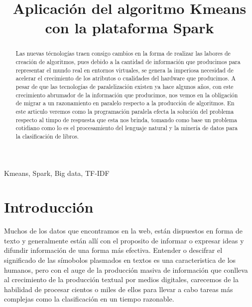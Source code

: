 \documentclass[conference,compsoc]{IEEEtran}
\begin{document}
\title{Aplicación del algoritmo Kmeans con la plataforma Spark}

\author{
    \and
}

\maketitle

\begin{IEEEkeywords}
    Kmeans, Spark, Big data, TF-IDF
\end{IEEEkeywords}

\vspace{0.5cm}

\begin{abstract}
Las nuevas técnologías traen consigo cambios en la forma de realizar las labores
de creación de algoritmos, pues debido a la cantidad de información que
producimos para representar el mundo real en entornos virtuales, se genera
la imperiosa necesidad de acelerar el crecimiento de los atributos o cualidades
del hardware que producimos. A pesar de que las tecnologías de
paralelización existen ya hace algunos años, con este crecimiento abrumador de
la información que producimos, nos vemos en la obligación de migrar a un
razonamiento en paralelo respecto a la producción de algoritmos. En este
articulo veremos como la programación paralela efecta la solución del problema
respecto al timpo de respuesta que esta nos brinda, tomando como base un
problema cotidiano como lo es el procesamiento del lenguaje natural y la
minería de datos para la clasificación de libros.
\end{abstract}

\section{Introducción}
Muchos de los datos que encontramos en la web, están dispuestos en forma de
texto y generalmente están allí  con el proposito de informar o expresar ideas
y difundir información de una forma más efectiva. Entender o descifrar  el
significado de las símobolos plasmados en textos es una caracteristica de los
humanos, pero con el auge de la producción masiva de información que conlleva
al crecimiento de la producción textual por medios digitales, carecemos de la
habilidad de procesar cientos o miles de ellos para llevar a cabo tareas más
complejas como la clasificación en un tiempo razonable.\\
\end{document}
